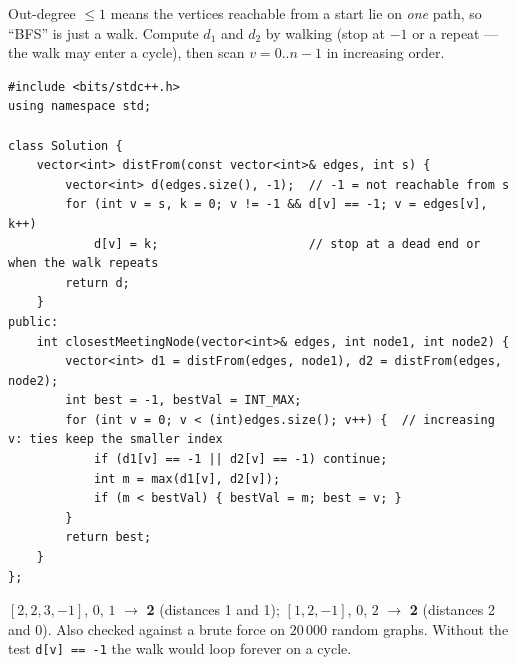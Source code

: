 \begin{solutionbox}
Out-degree $\le 1$ means the vertices reachable from a start lie on \emph{one} path, so ``BFS'' is just a walk. Compute $d_1$ and $d_2$ by walking (stop at $-1$ or a repeat --- the walk may enter a cycle), then scan $v = 0..n-1$ in increasing order.
\begin{center}
\end{center}
\begin{lstlisting}[style=cpp]
#include <bits/stdc++.h>
using namespace std;

class Solution {
    vector<int> distFrom(const vector<int>& edges, int s) {
        vector<int> d(edges.size(), -1);  // -1 = not reachable from s
        for (int v = s, k = 0; v != -1 && d[v] == -1; v = edges[v], k++)
            d[v] = k;                     // stop at a dead end or when the walk repeats
        return d;
    }
public:
    int closestMeetingNode(vector<int>& edges, int node1, int node2) {
        vector<int> d1 = distFrom(edges, node1), d2 = distFrom(edges, node2);
        int best = -1, bestVal = INT_MAX;
        for (int v = 0; v < (int)edges.size(); v++) {  // increasing v: ties keep the smaller index
            if (d1[v] == -1 || d2[v] == -1) continue;
            int m = max(d1[v], d2[v]);
            if (m < bestVal) { bestVal = m; best = v; }
        }
        return best;
    }
};
\end{lstlisting}
$[2,2,3,-1]$, $0$, $1$ $\to$ \textbf{2} (distances 1 and 1); \;$[1,2,-1]$, $0$, $2$ $\to$ \textbf{2} (distances 2 and 0). Also checked against a brute force on $20\,000$ random graphs. Without the test \texttt{d[v] == -1} the walk would loop forever on a cycle.
\end{solutionbox}

